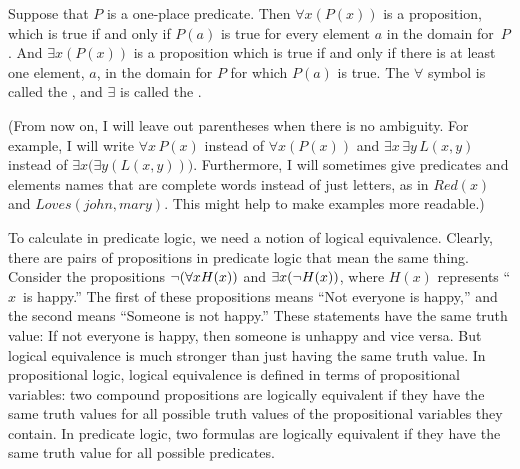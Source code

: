 \begin{definition}
Suppose that $P$ is a one-place predicate.  Then $\forall x(P(x))$ is
a proposition, which is true if and only if $P(a)$ is true for every
element $a$ in the domain for~$P$.  And $\exists x(P(x))$
is a proposition which is true if and only if there is at least one
element, $a$, in the domain for $P$ for which $P(a)$ is
true.  The $\forall$ symbol is called the ,
and $\exists$ is called the .
\end{definition}

(From now on, I will leave out parentheses when there is no ambiguity.
For example, I will write $\forall x\, P(x)$ instead of $\forall x(P(x))$
and $\exists x\,\exists y\,L(x,y)$ instead of
$\exists x\big(\exists y(L(x,y))\big)$.  Furthermore, I will
sometimes give predicates and elements names that are complete words
instead of just letters, as in  $Red(x)$ and $Loves(john,mary)$.
This might help to make examples more readable.)

\medbreak

To calculate in predicate logic, we need a notion of logical equivalence.
Clearly, there are pairs of propositions in predicate logic that mean the same
thing.  Consider the propositions $\lnot(\forall x H(x))$ and $\exists x(\lnot H(x))$, where
$H(x)$ represents ``$x$~is happy.'' The first of these propositions means
``Not everyone is happy,'' and the second means ``Someone is not happy.''
These statements have the same truth value:  If not everyone is happy, then someone is
unhappy and vice versa.  But logical equivalence is much stronger than just
having the same truth value.  In propositional logic, logical equivalence
is defined in terms of propositional variables:  two compound propositions
are logically equivalent if they have the same truth values for all possible
truth values of the propositional variables they contain.  In predicate logic, two
formulas are logically equivalent
if they have the same truth value for all
possible predicates.

